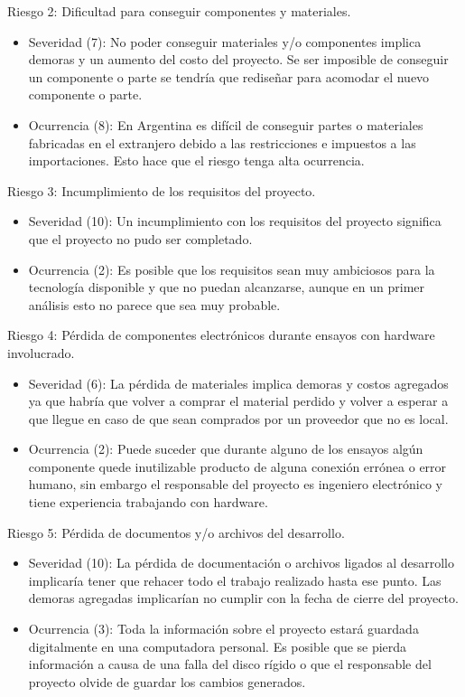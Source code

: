 \documentclass[11pt]{charter}
\begin{document}
Riesgo 2: Dificultad para conseguir componentes y materiales.
\begin{itemize}
\item Severidad (7): No poder conseguir materiales y/o componentes implica demoras y un aumento del costo del proyecto. Se ser imposible de conseguir un componente o parte se tendría que rediseñar para acomodar el nuevo componente o parte. 
\item Ocurrencia (8): En Argentina es difícil de conseguir partes o materiales fabricadas en el extranjero debido a las restricciones e impuestos a las importaciones. Esto hace que el riesgo tenga alta ocurrencia.
\end{itemize}

Riesgo 3: Incumplimiento de los requisitos del proyecto.
\begin{itemize}
\item Severidad (10): Un incumplimiento con los requisitos del proyecto significa que el proyecto no pudo ser completado.
\item Ocurrencia (2): Es posible que los requisitos sean muy ambiciosos para la tecnología disponible y que no puedan alcanzarse, aunque en un primer análisis esto no parece que sea muy probable.
\end{itemize}

Riesgo 4: Pérdida de componentes electrónicos durante ensayos con hardware involucrado.
\begin{itemize}
\item Severidad (6): La pérdida de materiales implica demoras y costos agregados ya que habría que volver a comprar el material perdido y volver a esperar a que llegue en caso de que sean comprados por un proveedor que no es local.
\item Ocurrencia (2): Puede suceder que durante alguno de los ensayos algún componente quede inutilizable producto de alguna conexión errónea o error humano, sin embargo el responsable del proyecto es ingeniero electrónico y tiene experiencia trabajando con hardware.
\end{itemize}

Riesgo 5: Pérdida de documentos y/o archivos del desarrollo.
\begin{itemize}
\item Severidad (10): La pérdida de documentación o archivos ligados al desarrollo implicaría tener que rehacer todo el trabajo realizado hasta ese punto. Las demoras agregadas implicarían no cumplir con la fecha de cierre del proyecto.
\item Ocurrencia (3): Toda la información sobre el proyecto estará guardada digitalmente en una computadora personal. Es posible que se pierda información a causa de una falla del disco rígido o que el responsable del proyecto olvide de guardar los cambios generados.
\end{itemize}
\end{document}
